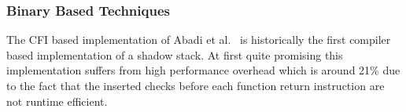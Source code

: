 \subsubsection{Binary Based Techniques}
The CFI based implementation of Abadi et al.~\cite{abadi:cfi} is historically the first compiler based implementation of a shadow stack.
At first quite promising this implementation suffers from high performance overhead which is around 21\% due to the fact that the inserted checks before each 
function return instruction are not runtime efficient.

% 
% 
